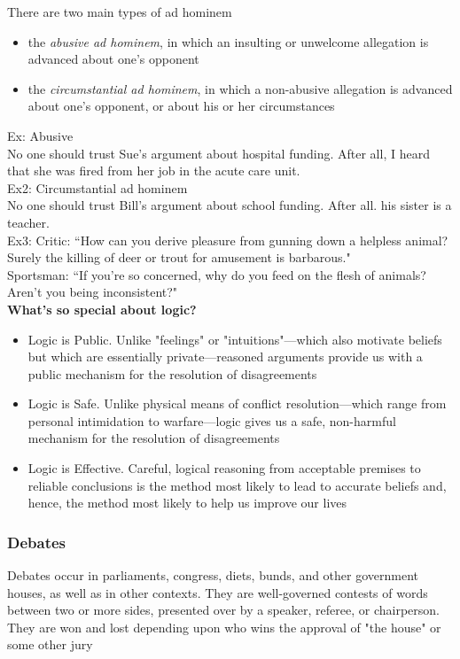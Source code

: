 There are two main types of ad hominem
\begin{itemize}
    \item the \textit{abusive ad hominem}, in which an insulting or unwelcome allegation is advanced about one's opponent
    \item the \textit{circumstantial ad hominem}, in which a non-abusive allegation is advanced about one's opponent, or about his or her circumstances
\end{itemize}

Ex: Abusive\\
No one should trust Sue's argument about hospital funding. After all, I heard that she was fired from her job in the acute care unit.\\

Ex2: Circumstantial ad hominem\\
No one should trust Bill's argument about school funding. After all. his sister is a teacher.\\

Ex3: Critic: ``How can you derive pleasure from gunning down a helpless animal? Surely the killing of deer or trout for amusement is barbarous."\\
Sportsman: ``If you're so concerned, why do you feed on the flesh of animals? Aren't you being inconsistent?"\\

\textbf{What's so special about logic?}
\begin{itemize}
    \item Logic is Public. Unlike "feelings" or "intuitions"—which also motivate beliefs but which are essentially private—reasoned arguments provide us with a public mechanism for the resolution of disagreements
    \item Logic is Safe. Unlike physical means of conflict resolution—which range from personal intimidation to warfare—logic gives us a safe, non-harmful mechanism for the resolution of disagreements
    \item Logic is Effective. Careful, logical reasoning from acceptable premises to reliable conclusions is the method most likely to lead to accurate beliefs and, hence, the method most likely to help us improve our lives
\end{itemize}





\subsubsection{Debates}
Debates occur in parliaments, congress, diets, bunds, and other government houses, as well as in other contexts. They are well-governed contests of words between two or more sides, presented over by a speaker, referee, or chairperson. They are won and lost depending upon who wins the approval of "the house" or some other jury\\

